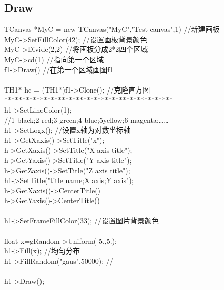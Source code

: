 \documentclass[11pt,a4paper,titlepage]{article}
\begin{document}
{\subsection{Draw}
TCanvas *MyC = new TCanvas("MyC","Test canvas",1)     //新建画板\\
MyC->SetFillColor(42);                                //设置画板背景颜色\\
MyC->Divide(2,2)                                      //将画板分成2*2四个区域\\
MyC->cd(1)                                            //指向第一个区域\\
f1->Draw()                                            //在第一个区域画图f1\\
\\
TH1* hc = (TH1*)f1->Clone();                          //克隆直方图\\
***********************************************\\
h1->SetLineColor(1);\\
//1 black;2 red;3 green;4 blue;5yellow;6 magenta;……\\
h1->SetLogx();   //设置x轴为对数坐标轴\\
h1->GetXaxis()->SetTitle("x");\\
h->GetXaxis()->SetTitle("X axis title");\\
h->GetYaxis()->SetTitle("Y axis title");\\
h->GetZaxis()->SetTitle("Z axis title");\\
h1->SetTitle("title name;X axis;Y axis");\\
h->GetXaxis()->CenterTitle()\\
h->GetYaxis()->CenterTitle()\\
\\
h1->SetFrameFillColor(33);    //设置图片背景颜色\\
\\
 float x=gRandom->Uniform(-5.,5.);\\
 h1->Fill(x);                       //均匀分布\\
h1->FillRandom("gaus",50000);       //\\
\\
h1->Draw();\\

}
\end{document}

